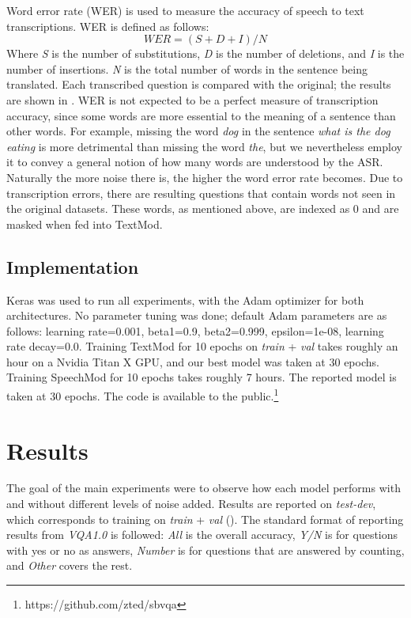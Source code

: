 \documentclass[letterpaper]{article} %
\begin{document}
Word error rate (WER) is used to measure the accuracy of speech to text transcriptions. WER is defined as follows: 
\begin{displaymath}
  \mathit{WER} = (S+D+I)/N
\end{displaymath}
Where \textit{S} is the number of substitutions, \textit{D} is the number of deletions, and \textit{I} is the number of insertions. \textit{N} is the total number of words in the sentence being translated. Each transcribed question is compared with the original; the results are shown in . WER is not expected to be a perfect measure of transcription accuracy, since some words are more essential to the meaning of a sentence than other words. For example, missing the word \emph{dog} in the sentence \emph{what is the dog eating} is more detrimental than missing the word \emph{the}, but we nevertheless employ it to convey a general notion of how many words are understood by the ASR. Naturally the more noise there is, the higher the word error rate becomes. Due to transcription errors, there are resulting questions that contain words not seen in the original datasets. These words, as mentioned above, are indexed as 0 and are masked when fed into TextMod.


\subsection{Implementation}
Keras was used to run all experiments, with the Adam \cite{kingma2014adam} optimizer for both architectures. No parameter tuning was done; default Adam parameters are as follows: learning rate=0.001, beta1=0.9, beta2=0.999, epsilon=1e-08, learning  rate decay=0.0. Training TextMod for 10 epochs on \textit{train} + \textit{val} takes roughly an hour on a Nvidia Titan X GPU, and our best model was taken at 30 epochs. Training SpeechMod for 10 epochs takes roughly 7 hours. The reported model is taken at 30 epochs. The code is available to the public.\footnote{https://github.com/zted/sbvqa}


\section{Results}
The goal of the main experiments were to observe how each model performs with and without different levels of noise added. Results are reported on \textit{test-dev}, which corresponds to training on \textit{train} + \textit{val} (). The standard format of reporting results from \textit{VQA1.0} is followed: \textit{All} is the overall accuracy, \textit{Y/N} is for questions with yes or no as answers, \textit{Number} is for questions that are answered by counting, and \textit{Other} covers the rest.
\end{document}

